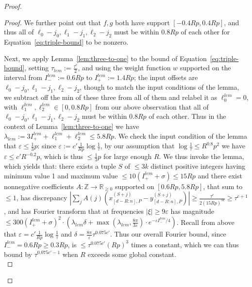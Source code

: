 \documentclass[10pt,a4paper]{amsart}
\newcommand{\eps}{\varepsilon}
\begin{document}
\begin{proof}
\begin{proof}
    We further point out that $f,g$ both have support $[-0.4Rp,0.4Rp]$, and thus all of $\ell_0-j_0,\ell_1-j_1,\ell_2-j_2$ must be within $0.8Rp$ of each other for Equation~\ref{eq:triple-bound} to be nonzero.

    Next, we apply Lemma~\ref{lem:three-to-one} to the bound of Equation~\ref{eq:triple-bound}, setting $\tau_{lem}:=\frac{\tau^c}{2}$, and using the weight function $w$ supported on the interval from $I_-^{lem}:=0.6Rp$ to $I_+^{lem}:=1.4Rp$; the input offsets are $\ell_0-j_0,\ell_1-j_1,\ell_2-j_2$, though to match the input conditions of the lemma, we subtract off the min of these three from all of them and relabel it as $\ell_0^{lem}=0$, with $\ell_1^{lem},\ell_2^{lem}\in[0,0.8Rp]$ from our above observation that all of $\ell_0-j_0,\ell_1-j_1,\ell_2-j_2$ must be within $0.8Rp$ of each other. Thus in the context of Lemma~\ref{lem:three-to-one} we have $\lambda_{lem}:= 3I_+^{lem}+\ell_1^{lem}+\ell_2^{lem}\leq 5.8Rp$. We check the input condition of the lemma that $\eps\leq\frac{1}{3}p$: since $\eps:=c' \frac{1}{Rp}\log\frac{1}{\tau}$, by our assumption that $\log\frac{1}{\tau}\leq R^{0.8}p^2$ we have $\eps\leq c' R^{-0.2} p$, which is thus $\leq\frac{1}{3}p$ for large enough $R$. We thus invoke the lemma, which yields that: there exists a tuple $S$ of $\leq 3k$ distinct positive integers having minimum value 1 and maximum value $\leq 10(I_+^{lem}+\sigma)\leq 15Rp$ and there exist nonnegative coefficients $A:\mathbb{Z}\rightarrow \mathbb{R}_{\geq 0}$ supported on $[0.6Rp,5.8Rp]$, that sum to $\leq 1$, has discrepancy $|\sum_j A(j)(x_{[d-R:n],P}^{(S+j)}-y_{[d-R:n],P}^{(S+j)})|\geq \frac{\tau^c}{2(15Rp)^{3k}}\geq\tau^{c+1}$, and has Fourier transform that at frequencies $|\xi|\geq 9\eps$ has magnitude  $\leq 300 (I_+^{lem}+\sigma)^2\cdot\left(\lambda_{lem}\delta+\max(\lambda_{lem},\frac{8\pi}{3\eps})\cdot e^{-\eps I_-^{lem}/4}\right)$. Recall from above that $\eps=c' \frac{1}{Rp}\log\frac{1}{\tau}$ and $\delta=\frac{8\pi}{\eps} \tau^{0.075 c'}$. Thus our overall Fourier bound, since $I_-^{lem}=0.6Rp\geq 0.3Rp$, is $\leq \tau^{0.075c'} (Rp)^3$ times a constant, which we can thus bound by $\tau^{0.075c'-1}$ when $R$ exceeds some global constant. \\


\end{proof}
\end{proof}
\end{document}
